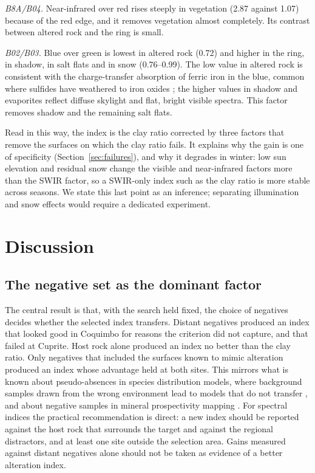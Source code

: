 \documentclass[preprint,authoryear,number]{elsarticle}
\begin{document}
\emph{B8A/B04.} Near-infrared over red rises steeply in vegetation (2.87 against 1.07) because of the red edge, and it removes vegetation almost completely. Its contrast between altered rock and the ring is small.

\emph{B02/B03.} Blue over green is lowest in altered rock (0.72) and higher in the ring, in shadow, in salt flats and in snow (0.76--0.99). The low value in altered rock is consistent with the charge-transfer absorption of ferric iron in the blue, common where sulfides have weathered to iron oxides \citep{Sabins1999}; the higher values in shadow and evaporites reflect diffuse skylight and flat, bright visible spectra. This factor removes shadow and the remaining salt flats.

Read in this way, the index is the clay ratio corrected by three factors that remove the surfaces on which the clay ratio fails. It explains why the gain is one of specificity (Section~\ref{sec:failures}), and why it degrades in winter: low sun elevation and residual snow change the visible and near-infrared factors more than the SWIR factor, so a SWIR-only index such as the clay ratio is more stable across seasons. We state this last point as an inference; separating illumination and snow effects would require a dedicated experiment.

\section{Discussion}
\label{sec:discussion}

\subsection{The negative set as the dominant factor}

The central result is that, with the search held fixed, the choice of negatives decides whether the selected index transfers. Distant negatives produced an index that looked good in Coquimbo for reasons the criterion did not capture, and that failed at Cuprite. Host rock alone produced an index no better than the clay ratio. Only negatives that included the surfaces known to mimic alteration produced an index whose advantage held at both sites. This mirrors what is known about pseudo-absences in species distribution models, where background samples drawn from the wrong environment lead to models that do not transfer \citep{Phillips2009,BarbetMassin2012}, and about negative samples in mineral prospectivity mapping \citep{Zuo2020,Zhang2025}. For spectral indices the practical recommendation is direct: a new index should be reported against the host rock that surrounds the target and against the regional distractors, and at least one site outside the selection area. Gains measured against distant negatives alone should not be taken as evidence of a better alteration index.
\end{document}
